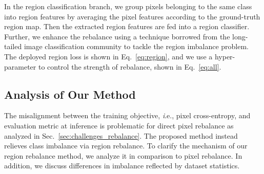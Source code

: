 \documentclass[final]{cvpr}
\begin{document}
In the region classification branch, we group pixels belonging to the same class into region features by averaging the pixel features according to the ground-truth region map. Then the extracted region features are fed into a region classifier.
Further, we enhance the rebalance using a technique \cite{DBLP:conf/nips/RenYSMZYL20} borrowed from the long-tailed image classification community to tackle the region imbalance problem. The deployed region loss is shown in Eq.~\eqref{eq:region}, and we use a hyper-parameter  to control the strength of rebalance, shown in Eq.~\eqref{eq:all}.


\subsection{Analysis of Our Method}
The misalignment between the training objective, {\textit i.e.}, pixel cross-entropy, and evaluation metric  at inference is problematic for direct pixel rebalance as analyzed in Sec.~\ref{sec:challenges_rebalance}. The proposed method instead relieves class imbalance via region rebalance. To clarify the mechanism of our region rebalance method, we analyze it in comparison to pixel rebalance. In addition, we discuss differences in imbalance reflected by dataset statistics.
\end{document}

